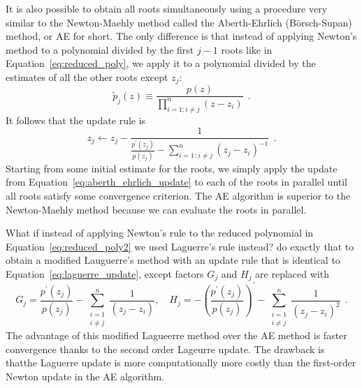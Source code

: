 \documentclass[12pt,dvipsnames]{report}
\newcommand{\ssf}[1]{\textsf{#1}}
\newcommand{\hquad}{~~}
\begin{document}
It is also possible to obtain all roots simultaneously using a procedure very similar to 
the Newton-Maehly method called the \ssf{Aberth-Ehrlich} (\ssf{B\"{o}rsch-Supan}) method,
or AE for short. The only difference is that instead of applying Newton's method to a 
polynomial divided by the first $j-1$ roots like in Equation~\ref{eq:reduced_poly}, we 
apply it to a polynomial divided by the estimates of all the other roots except $z_j$:
\begin{equation}
    \tilde{p}_{j}(z) \equiv \frac{p(z)}{\prod_{i=1;i\neq j}^{n}(z-z_i)}
    \hquad .
    \label{eq:reduced_poly2}
\end{equation}
It follows that the update rule is 
\begin{equation}
    z_j \leftarrow z_j - \frac{1}{\frac{p^\prime (z_j)}{p(z_j)} - \sum_{i=1\,;i\neq j}^{n}\left(z_j-z_{i}\right)^{-1}}
    \hquad .
    \label{eq:aberth_ehrlich_update}
\end{equation}
Starting from some initial estimate for the roots, we simply apply the update from
Equation~\ref{eq:aberth_ehrlich_update} to each of the roots in parallel until all 
roots satisfy some convergence criterion. The AE algorithm is superior to the Newton-Maehly
method because we can evaluate the roots in parallel.

What if instead of applying Newton's rule to the reduced polynomial in 
Equation~\ref{eq:reduced_poly2} we used Laguerre's rule instead?  \citet{cameron2019} 
do exactly that to obtain a modified Lauguerre's method with an update rule that is 
identical to Equation~\ref{eq:laguerre_update}, except factors $G_j$ and $H_j$ are 
replaced with
\begin{equation}
    G_{j}=\frac{p^{\prime}\left(z_{j}\right)}{p\left(z_{j}\right)}-
    \sum_{\substack{i=1 \\ i \neq j}}^{n} \frac{1}{\left(z_{j}-z_{i}\right)} ,\quad H_{j}=-\left(\frac{p^{\prime}\left(z_{j}\right)}{p\left(z_{j}\right)}\right)^{\prime}-\sum_{\substack{i=1 \\ i \neq j}}^{n} \frac{1}{\left(z_{j}-z_{i}\right)^{2}}
    \hquad.
\end{equation}
The advantage of this modified Lagueerre method over the AE method is faster convergence 
thanks to the second order Lageurre update. The drawback is thatthe Laguerre update is more 
computationally more costly than the first-order Newton update in the AE algorithm. 
\end{document}
